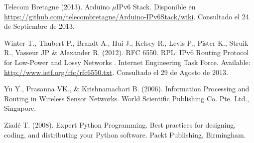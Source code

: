 \begin{spacing}{1.0}
\begin{thebibliography}{99}
Telecom Bretagne (2013).
\newblock Arduino $\mu$IPv6 Stack.
\newblock Disponible en \url{https://github.com/telecombretagne/Arduino-IPv6Stack/wiki}.
\newblock Consultado el 24 de Septiembre de 2013. 

Winter T., Thubert P., Brandt A., Hui J., Kelsey R., Levis P., Pister K., Struik R., Vasseur JP \& Alexander R. (2012). 
\newblock RFC 6550. RPL: IPv6 Routing Protocol for Low-Power and Lossy Networks . Internet Engineering Task Force.
\newblock Available: \url{http://www.ietf.org/rfc/rfc6550.txt}.
\newblock Consultado el 29 de Agosto de 2013.

Yu Y., Prasanna VK., \& Krishnamachari B. (2006).
\newblock Information Processing and Routing in Wireless Sensor Networks.
\newblock World Scientific Publishing Co. Pte. Ltd., Singapore.

Ziadé T. (2008).
\newblock Expert Python Programming. Best practices for designing, coding, and distributing your Python software.
\newblock Packt Publishing, Birmingham.

\end{thebibliography}	
\end{spacing}

